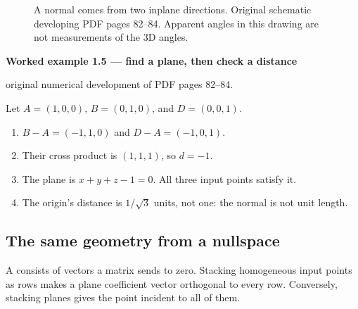 \documentclass[letterpaper,11pt,english,openany,oneside]{jupyterBook}
\begin{document}
\begin{figure}[H]
\centering
\capstart

\noindent{}
\caption{A normal comes from two in\sphinxhyphen{}plane directions. Original schematic developing PDF pages 82–84. Apparent angles in this drawing are not measurements of the 3D angles.}\label{\detokenize{lectures/lecture01/planes-lines:fig-lec01-plane}}\end{figure}
\label{\detokenize{lectures/lecture01/planes-lines:ex-lec01-plane}}
\begin{TextbookBox}
\textbf{Worked example 1.5 — find a plane, then check a distance}\par\smallskip

\sphinxAtStartPar
{} original numerical development of PDF pages 82–84.

\sphinxAtStartPar
Let \(A=(1,0,0)\), \(B=(0,1,0)\), and \(D=(0,0,1)\).
\begin{enumerate}
%
\item {}
\sphinxAtStartPar
\(B-A=(-1,1,0)\) and \(D-A=(-1,0,1)\).

\item {}
\sphinxAtStartPar
Their cross product is \((1,1,1)\), so \(d=-1\).

\item {}
\sphinxAtStartPar
The plane is \(x+y+z-1=0\). All three input points satisfy it.

\item {}
\sphinxAtStartPar
The origin’s distance is \(1/\sqrt3\) units, not one: the normal is not unit length.

\end{enumerate}

\end{TextbookBox}


\subsection{The same geometry from a nullspace}
\label{\detokenize{lectures/lecture01/planes-lines:the-same-geometry-from-a-nullspace}}
\sphinxAtStartPar
A  consists of vectors a matrix sends to zero. Stacking homogeneous input points as rows makes a plane coefficient vector orthogonal to every row. Conversely, stacking planes gives the point incident to all of them.
\end{document}
